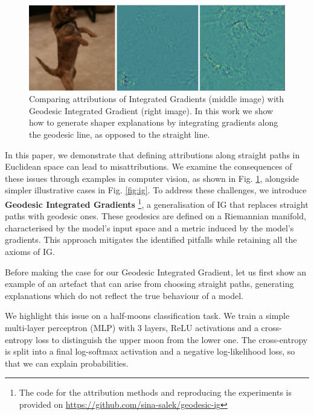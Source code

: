 \begin{figure}[t!]
	\begin{center}
		\centerline{\includegraphics[width=0.95\columnwidth]{figures/voc_compare.png}}
		\caption{Comparing attributions of Integrated Gradients (middle image) with Geodesic Integrated Gradient (right image). In this work we show how to generate shaper explanations by integrating gradients along the geodesic line, as opposed to the straight line.}
		\label{fig:puppy}
	\end{center}
	\vskip -0.3in
\end{figure}

In this paper, we demonstrate that defining attributions along straight paths in Euclidean space can lead to misattributions. We examine the consequences of these issues through examples in computer vision, as shown in Fig. \ref{fig:puppy}, alongside simpler illustrative cases in Fig. \ref{fig:ig}. To address these challenges, we introduce \textbf{Geodesic Integrated Gradients} \footnote{The code for the attribution methods and reproducing the experiments is provided on \href{https://github.com/sina-salek/geodesic-ig}{https://github.com/sina-salek/geodesic-ig}}, a generalisation of IG that replaces straight paths with geodesic ones. These geodesics are defined on a Riemannian manifold, characterised by the model's input space and a metric induced by the model's gradients. This approach mitigates the identified pitfalls while retaining all the axioms of IG.

Before making the case for our Geodesic Integrated Gradient, let us first show an example of an artefact that can arise from choosing straight paths, generating explanations which do not reflect the true behaviour of a model. 

We highlight this issue on a half-moons classification task. We train a simple multi-layer perceptron (MLP) with 3 layers, ReLU activations and a cross-entropy loss to distinguish the upper moon from the lower one. The cross-entropy is split into a final log-softmax activation and a negative log-likelihood loss, so that we can explain probabilities.

